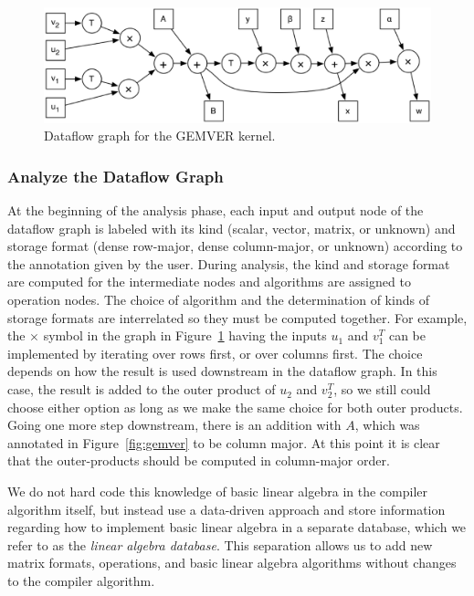 \documentclass[runningheads]{llncs}
\begin{document}
\begin{figure}[htbp]
\centering
\includegraphics[width=.7\textwidth]{figures/gemver-dataflow.eps}
 
\caption{Dataflow graph for the GEMVER kernel.}
\label{fig:gemver-dataflow}
\end{figure}

\subsubsection{Analyze the Dataflow Graph}

At the beginning of the analysis phase, each input and output node of the dataflow graph is labeled with its kind (scalar, vector, matrix, or unknown) and storage format (dense row-major, dense column-major, or unknown) according to the annotation given by the user.  During analysis, the kind and storage format are computed for the intermediate nodes and algorithms are assigned to operation nodes. The choice of algorithm and the determination of kinds of storage formats are interrelated so they must be computed together.  For example, the $\times$ symbol in the graph in Figure~\ref{fig:gemver-dataflow} having the inputs $u_1$ and $v_1^T$ can be implemented by iterating over rows first, or over columns first. The choice depends on how the result is used downstream in the dataflow graph.  In this case, the result is added to the outer product of $u_2$ and $v_2^T$, so we still could choose either option as long as we make the same choice for both outer products. Going one more step downstream, there is an addition with $A$, which was annotated in Figure~\ref{fig:gemver} to be column major. At this point it is clear that the outer-products should be computed in column-major order.

We do not hard code this knowledge of basic linear algebra in the compiler algorithm itself, but instead use a data-driven approach and store information regarding how to implement basic linear algebra in a separate database, which we refer to as the \emph{linear algebra database}.  This separation allows us to add new matrix formats, operations, and basic linear algebra algorithms without changes to the
compiler algorithm. 
\end{document}

